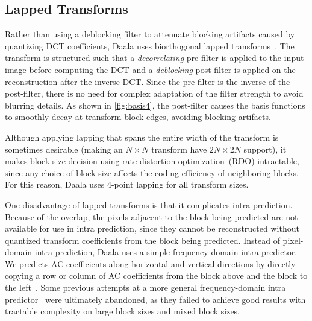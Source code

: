 \documentclass[english,conference,10pt]{IEEEtran}
\begin{document}
\subsection{Lapped Transforms}

Rather than using a deblocking filter to attenuate blocking artifacts caused
by quantizing DCT coefficients, Daala uses biorthogonal lapped
transforms~\cite{MalvarS89,Tran2003}. The transform is structured such that
a \textit{decorrelating} pre-filter is applied to the input image before computing
the DCT and a \textit{deblocking} post-filter is applied on the reconstruction
after the inverse DCT\@. Since the pre-filter is the inverse of the post-filter,
there is no need for complex adaptation of the filter strength to avoid blurring
details. As shown in \cref{fig:basis4}, the post-filter causes the basis functions
to smoothly decay at transform block edges, avoiding blocking artifacts.

Although applying lapping that spans the entire width of the transform is
sometimes desirable (making an $N \times N$ transform have $2N \times 2N$ support),
it makes block size decision using rate-distortion optimization~(RDO) intractable,
since any choice of block size affects the coding efficiency of neighboring blocks. For
this reason, Daala uses 4-point lapping for all transform sizes.

One disadvantage of lapped transforms is that it complicates intra prediction.
Because of the overlap, the pixels adjacent to the block being predicted are not
available for use in intra prediction, since they cannot be reconstructed
without quantized transform coefficients from the block being predicted.
Instead of pixel-domain intra prediction, Daala uses a simple
frequency-domain intra predictor. We predicts AC coefficients along horizontal
and vertical directions by directly copying a row or column of AC
coefficients from the block above and the block to the left~\cite{EggePCS}.
Some previous attempts at a more general
frequency-domain intra predictor~\cite{fdintra-demo} were ultimately abandoned,
as they failed to achieve good results with tractable complexity on large block
sizes and mixed block sizes.
\end{document}
